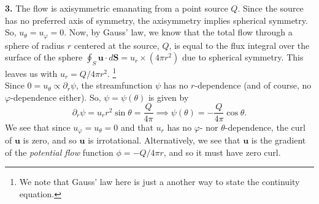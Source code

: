 \documentclass[11pt]{article}
\newcommand{\f}[2]{\frac{#1}{#2}}
\newcommand{\p}{\partial}%
\begin{document}
\noindent \textbf{3.}  The flow is axisymmetric emanating from a point source $Q$. Since the source has no preferred axis of symmetry, the axisymmetry implies spherical symmetry. So, $u_\theta = u_\varphi = 0$. Now, by Gauss' law, we know that the total flow through a sphere of radius $r$ centered at the source, $Q$, is equal to the flux integral over the surface of the sphere $\oint_S \mathbf{u}\cdot d\mathbf{S} = u_r\times (4\pi r^2)$ due to spherical symmetry. This leaves us with $u_r = Q/4\pi r^2$. \footnote{We note that Gauss' law here is just a another way to state the continuity equation.} \\

\noindent Since $0 = u_\theta \propto \p_r \psi$, the streamfunction $\psi$ has no $r$-dependence (and of course, no $\varphi$-dependence either). So, $\psi = \psi(\theta)$ is given by 
\begin{equation*}
\p_r \psi = u_r r^2 \sin\theta = \f{Q}{4\pi} \implies \psi(\theta) = -\f{Q}{4\pi}\cos\theta.
\end{equation*}
We see that since $u_\varphi = u_\theta = 0$ and that $u_r$ has no $\varphi$- nor $\theta$-dependence, the curl of $\mathbf{u}$ is zero, and so $\mathbf{u}$ is irrotational. Alternatively, we see that $\mathbf{u}$ is the gradient of the \textit{potential flow} function $\phi = -Q/4\pi r$, and so it must have zero curl. \\
\end{document}
